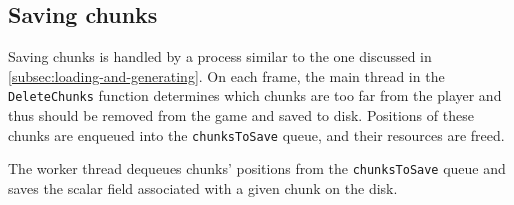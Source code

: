 \subsection{Saving chunks}
Saving chunks is handled by a process similar to the one discussed in \autoref{subsec:loading-and-generating}.
On each frame, the main thread in the \texttt{DeleteChunks} function determines which chunks are too far from the player and thus should be removed from the game and saved to disk.
Positions of these chunks are enqueued into the \texttt{chunksToSave} queue, and their resources are freed.

The worker thread dequeues chunks' positions from the \texttt{chunksToSave} queue and saves the scalar field associated with a given chunk on the disk.